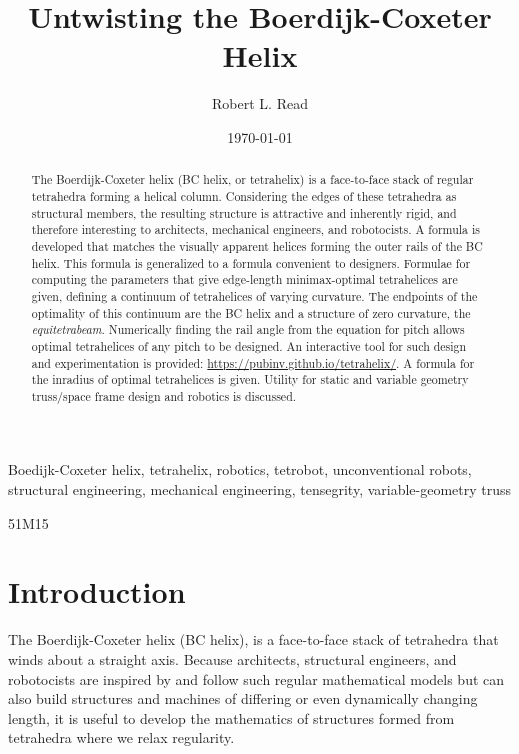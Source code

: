 \documentclass[review]{siamonline1116}
\title{Untwisting the Boerdijk-Coxeter Helix}
\author{Robert L. Read \email{read.robert@gmail.com}
}
\date{\today}
\begin{document}
\maketitle


\begin{abstract}
  The Boerdijk-Coxeter helix (BC helix, or tetrahelix) is a
  face-to-face stack of regular tetrahedra forming a helical column.  Considering the edges of
  these tetrahedra as structural members, the resulting structure is attractive and
  inherently rigid, and therefore interesting to architects,
  mechanical engineers, and robotocists.  A formula is developed that matches the
  visually apparent helices forming the outer rails of the BC helix.
  This formula is generalized to a formula convenient to designers.
  Formulae for 
  computing the
  parameters that give edge-length minimax-optimal tetrahelices
  are given, defining a continuum of tetrahelices of varying curvature.
  The endpoints of the optimality of this continuum are the BC helix and
  a structure of zero curvature, the \emph{equitetrabeam}.
  Numerically finding the rail angle from the equation for
  pitch allows optimal tetrahelices of any pitch to be designed. 
  An interactive tool for such design and experimentation is provided: \url{https://pubinv.github.io/tetrahelix/}.
  A formula for the inradius of optimal tetrahelices is given.
  Utility for static and variable geometry
  truss/space frame design and robotics is discussed.
\end{abstract}

\begin{keywords}
  Boedijk-Coxeter helix, tetrahelix, robotics, tetrobot, unconventional robots,
  structural engineering, mechanical engineering, tensegrity, variable-geometry truss
\end{keywords}
\begin{AMS}
  51M15
\end{AMS}



\section{Introduction}

The Boerdijk-Coxeter helix\cite{coxeter1985simplicial} (BC helix), is
a face-to-face stack of tetrahedra that winds about a straight axis.
Because architects, structural engineers, and robotocists are inspired
by and follow such regular mathematical models but can also build structures and
machines of differing or even dynamically changing length, it is
useful to develop the mathematics of structures formed from tetrahedra
where we relax regularity.
\end{document}
